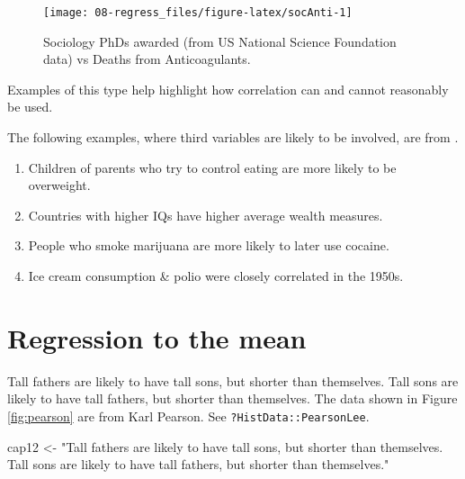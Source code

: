 \documentclass[
  10pt,
  b5paper]{book}
\newenvironment{Shaded}{\begin{snugshade}}{\end{snugshade}}
\newcommand{\NormalTok}[1]{#1}
\newcommand{\OtherTok}[1]{\textcolor[rgb]{0.56,0.35,0.01}{#1}}
\newcommand{\StringTok}[1]{\textcolor[rgb]{0.31,0.60,0.02}{#1}}
\providecommand{\tightlist}{%
  \setlength{\itemsep}{0pt}\setlength{\parskip}{0pt}}
\begin{document}
\begin{figure}
\texttt{[image: 08-regress\_files/figure-latex/socAnti-1]} \caption{Sociology PhDs awarded (from US National Science 
Foundation data) vs Deaths from Anticoagulants.
}\label{fig:socAnti}
\end{figure}

Examples of this type help highlight how correlation can and
cannot reasonably be used.

The following examples, where third variables are likely to
be involved, are from \citep[pages 133-134]{nisbett}.

\begin{enumerate}
\def\labelenumi{\arabic{enumi}.}
\tightlist
\item
  Children of parents who try to control eating are more likely
  to be overweight.
\item
  Countries with higher IQs have higher average wealth measures.
\item
  People who smoke marijuana are more likely to later use cocaine.
\item
  Ice cream consumption \& polio were closely correlated in the 1950s.
\end{enumerate}

\hypertarget{regression-to-the-mean}{%
\section{Regression to the mean}\label{regression-to-the-mean}}

Tall fathers are likely to have tall sons, but shorter than themselves.
Tall sons are likely to have tall fathers, but shorter than themselves.
The data shown in Figure \ref{fig:pearson} are from Karl Pearson.
See \texttt{?HistData::PearsonLee}.

\begin{Shaded}
\begin{Highlighting}[]
\NormalTok{cap12 }\OtherTok{\textless{}{-}} \StringTok{"Tall fathers are likely to have tall sons, but shorter than themselves. }
\StringTok{Tall sons are likely to have tall fathers, but shorter than themselves."}
\end{Highlighting}
\end{Shaded}
\end{document}

